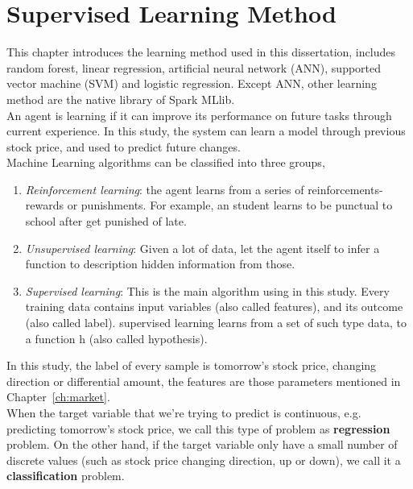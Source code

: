 \chapter{Supervised Learning Method}
\label{ch:machine}

This chapter introduces the learning method used in this dissertation, includes random forest, linear regression, artificial neural network (ANN), supported vector machine (SVM) and logistic regression. Except ANN, other learning method are the native library of Spark MLlib.\\


An agent is learning if it can improve its performance on future tasks through current experience\cite{russell2003artificial}. In this study, the system can learn a model through previous stock price, and used to predict future changes.\\


Machine Learning algorithms can be classified into three groups\cite{russell2003artificial}, 
\begin{enumerate}
	\item \textit{Reinforcement learning}: the agent learns from a series of reinforcements-rewards or punishments. For example, an student learns to be punctual to school after get punished of late.
	\item \textit{Unsupervised learning}: Given a lot of data, let the agent itself to infer a function to description hidden information from those.
	\item \textit{Supervised learning}: This is the main algorithm using in this study. Every training data contains input variables (also called features), and its outcome (also called label). supervised learning learns from a set of such type data, to a function h (also called hypothesis).
\end{enumerate}


In this study, the label of every sample is tomorrow's stock price, changing direction or differential amount, the features are those parameters mentioned in Chapter~\ref{ch:market}.\\


When the target variable that we're trying to predict is continuous, e.g. predicting tomorrow's stock price, we call this type of problem as \textbf{regression} problem. On the other hand, if the target variable only have a small number of discrete values (such as stock price changing direction, up or down), we call it a \textbf{classification} problem.


